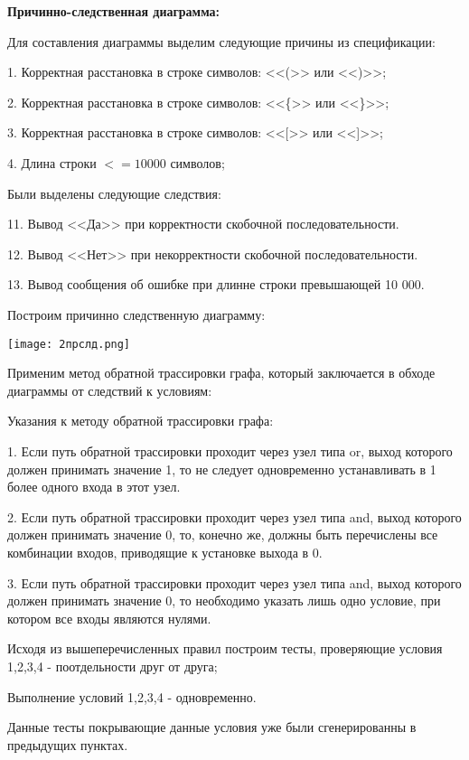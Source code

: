 \documentclass[12pt]{article}
\begin{document}
{\bf Причинно-следственная диаграмма:}

Для составления диаграммы выделим следующие причины из спецификации:

1. Корректная расстановка в строке символов:  <<(>> или <<)>>;

2. Корректная расстановка в строке символов:  <<\{>> или <<\}>>;

3. Корректная расстановка в строке символов:  <<[>> или <<]>>;

4. Длина строки $<= 10 000$ символов;

Были выделены следующие следствия:

11.  Вывод <<Да>>  при корректности скобочной последовательности.

12.  Вывод <<Нет>>  при некорректности скобочной последовательности.

13.  Вывод сообщения об ошибке  при длинне строки превышающей 10 000.

Построим причинно следственную диаграмму:




\vskip 1cm
{
    \centering
    \texttt{[image: 2прслд.png]}
   
    \label{fig:i1}
}
\vskip 1cm


Применим метод обратной трассировки графа, который заключается в обходе диаграммы от следствий к условиям:

Указания к методу обратной трассировки графа:

1. Если путь обратной трассировки проходит через узел типа or, выход которого должен принимать значение 1, то не следует одновременно устанавливать в 1 более одного входа в этот узел.

2. Если путь обратной трассировки проходит через узел типа and, вы­ход которого должен принимать значение 0, то, конечно же, должны быть перечислены все комбинации входов, приводящие к установке выхода в 0. 

3. Если путь обратной трассировки проходит через узел типа and, выход которого должен принимать значение 0, то необходимо указать лишь одно условие, при котором все входы являются нулями.

Исходя из вышеперечисленных правил построим тесты, проверяющие условия 1,2,3,4 -  поотдельности друг от друга;

Выполнение условий 1,2,3,4 - одновременно.

Данные тесты покрывающие данные условия уже были сгенерированны в предыдущих пунктах.
\end{document}
